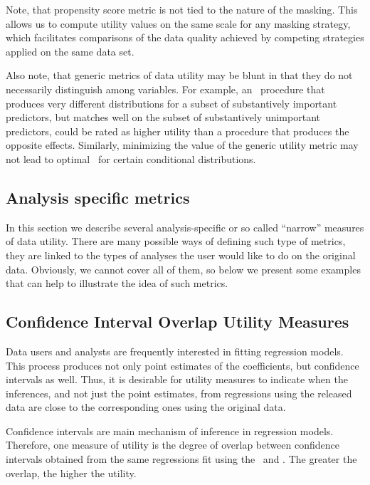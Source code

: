 Note, that propensity score metric is not tied to the nature of the
masking.  This allows us to compute utility values on the same scale
for any masking strategy, which facilitates comparisons of the data
quality achieved by competing strategies applied on the same data
set.

Also note, that generic metrics of data utility may be blunt in that they do not necessarily distinguish among variables. For example, an \SDL\ procedure that produces very different distributions for a subset of substantively important predictors, but matches well on the subset of substantively unimportant predictors, could be rated as higher utility than a procedure that produces the opposite effects.  Similarly, minimizing the value of the generic utility metric may not lead to optimal \DBREL\ for certain conditional distributions.  

\subsection{Analysis specific metrics}
In this section we describe several analysis-specific or so called ``narrow'' measures of data utility. There are many possible ways of defining such type of metrics,  they 
are linked to the types of analyses the user would like to do on the original data.
 Obviously, we cannot cover all of them, so below we present some examples 
 that can help to illustrate the idea of such metrics.



\subsection{Confidence Interval Overlap Utility Measures}\label{subsec.ci}

Data users and analysts  are frequently interested in fitting regression models. 
This process produces not only point estimates of the coefficients, but
confidence intervals as well. Thus, it is desirable for utility measures 
to indicate when the inferences, and
not just the point estimates, from regressions using the released
data are close to the corresponding ones using the original data.

Confidence intervals are main mechanism of inference in regression
models. Therefore, one measure of utility is the degree of overlap
between confidence intervals obtained from the same regressions
fit using the \DBREL\ and \DBORIG. The greater the overlap, the
higher the utility.

